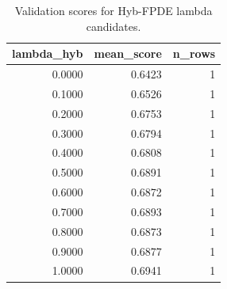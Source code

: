 \begin{table}[t]
\caption{Validation scores for Hyb-FPDE lambda candidates.}
\label{tab:lambda_distribution_computed}
\centering
\begin{tabular}{rrr}
\toprule
lambda\_hyb & mean\_score & n\_rows \\
\midrule
0.0000 & 0.6423 & 1 \\
0.1000 & 0.6526 & 1 \\
0.2000 & 0.6753 & 1 \\
0.3000 & 0.6794 & 1 \\
0.4000 & 0.6808 & 1 \\
0.5000 & 0.6891 & 1 \\
0.6000 & 0.6872 & 1 \\
0.7000 & 0.6893 & 1 \\
0.8000 & 0.6873 & 1 \\
0.9000 & 0.6877 & 1 \\
1.0000 & 0.6941 & 1 \\
\bottomrule
\end{tabular}

\end{table}
